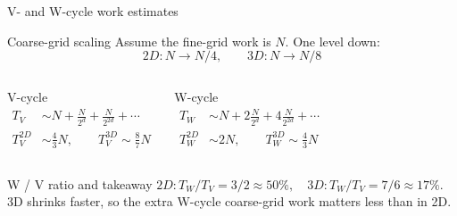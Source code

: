 \documentclass[aspectratio=169]{beamer}
\newcommand{\frametitlesub}[2]{#2}
\begin{document}
\begin{frame}[t]{\frametitlesub{Coarse-grid solve and cost}{V- and W-cycle work estimates}}
    \footnotesize
    \setlength{\abovedisplayskip}{4pt}
    \setlength{\belowdisplayskip}{4pt}
    \setlength{\abovedisplayshortskip}{2pt}
    \setlength{\belowdisplayshortskip}{2pt}
    \begin{block}{Coarse-grid scaling}
        Assume the fine-grid work is \(N\). One level down:
        \[
            2D: N \rightarrow N/4, \qquad 3D: N \rightarrow N/8
        \]
    \end{block}

    \begin{columns}[T,onlytextwidth]
        \begin{block}{V-cycle}
            \[
                \begin{aligned}
                    T_V      & \sim N + \frac{N}{2^d} + \frac{N}{2^{2d}} + \cdots   \\
                    T_V^{2D} & \sim \frac{4}{3}N, \qquad T_V^{3D} \sim \frac{8}{7}N
                \end{aligned}
            \]
        \end{block}

        \begin{block}{W-cycle}
            \[
                \begin{aligned}
                    T_W      & \sim N + 2\frac{N}{2^d} + 4\frac{N}{2^{2d}} + \cdots \\
                    T_W^{2D} & \sim 2N, \qquad T_W^{3D} \sim \frac{4}{3}N
                \end{aligned}
            \]
        \end{block}
    \end{columns}

    \begin{block}{W / V ratio and takeaway}
        \(2D: T_W/T_V = 3/2 \approx 50\%, \quad 3D: T_W/T_V = 7/6 \approx 17\%\).
        3D shrinks faster, so the extra W-cycle coarse-grid work matters less than in 2D.
    \end{block}
\end{frame}
\end{document}
